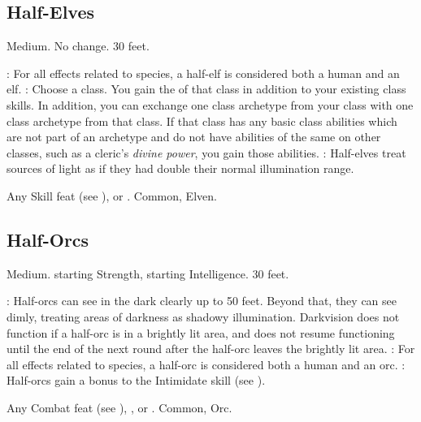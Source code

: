 \subsection{Half-Elves}
 Medium.
 No change.
 30 feet.
\begin{itemize}
    : For all effects related to species, a half-elf is considered both a human and an elf.
    : Choose a class.
        You gain the  of that class in addition to your existing class skills.
        In addition, you can exchange one class archetype from your class with one class archetype from that class.
        If that class has any basic class abilities which are not part of an archetype and do not have abilities of the same on other classes, such as a cleric's \textit{divine power}, you gain those abilities.
    : Half-elves treat sources of light as if they had double their normal illumination range.
\end{itemize}
 Any Skill feat (see ), or .
 Common, Elven.

\subsection{Half-Orcs}
 Medium.
  starting Strength,  starting Intelligence.
 30 feet.
\begin{itemize}
    : Half-orcs can see in the dark clearly up to 50 feet.   Beyond that, they can see dimly, treating areas of darkness as shadowy illumination. Darkvision does not function if a half-orc is in a brightly lit area, and does not resume functioning until the end of the next round after the half-orc leaves the brightly lit area.
    : For all effects related to species, a half-orc is considered both a human and an orc.
    : Half-orcs gain a  bonus to the Intimidate skill (see ).
\end{itemize}
 Any Combat feat (see ), , or .
 Common, Orc.

